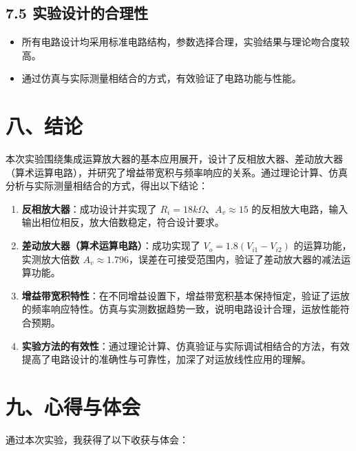 \documentclass[12pt,a4paper]{article}
\begin{document}
\subsection*{7.5 实验设计的合理性}
\begin{itemize}
    \item 所有电路设计均采用标准电路结构，参数选择合理，实验结果与理论吻合度较高。
    \item 通过仿真与实际测量相结合的方式，有效验证了电路功能与性能。
\end{itemize}



\section*{八、结论}

本次实验围绕集成运算放大器的基本应用展开，设计了反相放大器、差动放大器（算术运算电路），并研究了增益带宽积与频率响应的关系。通过理论计算、仿真分析与实际测量相结合的方式，得出以下结论：

\begin{enumerate}
    \item \textbf{反相放大器}：成功设计并实现了 \( R_i = 18k\Omega \)、\( A_v \approx 15 \) 的反相放大电路，输入输出相位相反，放大倍数稳定，符合设计要求。
    \item \textbf{差动放大器（算术运算电路）}：成功实现了 \( V_o = 1.8(V_{i1} - V_{i2}) \) 的运算功能，实测放大倍数 \( A_v \approx 1.796 \)，误差在可接受范围内，验证了差动放大器的减法运算功能。
    \item \textbf{增益带宽积特性}：在不同增益设置下，增益带宽积基本保持恒定，验证了运放的频率响应特性。仿真与实测数据趋势一致，说明电路设计合理，运放性能符合预期。
    \item \textbf{实验方法的有效性}：通过理论计算、仿真验证与实际调试相结合的方法，有效提高了电路设计的准确性与可靠性，加深了对运放线性应用的理解。
\end{enumerate}


\section*{九、心得与体会}

通过本次实验，我获得了以下收获与体会：
\end{document}
